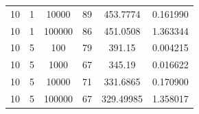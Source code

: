 \documentclass[11pt,a4paper]{report}
\begin{document}
\begin{table}[H]
{\begin{tabular}{c|c|c|c|c|c}
10                                                                                   & 1                                                                                      & 10000                                                                     & 89                                                                                        & 453.7774                                                                  & 0.161990              \\
10                                                                                   & 1                                                                                      & 100000                                                                    & 86                                                                                        & 451.0508                                                                  & 1.363344              \\ \hline
10                                                                                   & 5                                                                                      & 100                                                                       & 79                                                                                        & 391.15                                                                    & 0.004215              \\
10                                                                                   & 5                                                                                      & 1000                                                                      & 67                                                                                        & 345.19                                                                    & 0.016622              \\
10                                                                                   & 5                                                                                      & 10000                                                                     & 71                                                                                        & 331.6865                                                                  & 0.170900              \\
10                                                                                   & 5                                                                                      & 100000                                                                    & 67                                                                                        & 329.49985                                                                 & 1.358017              \\ \hline

\end{tabular}}
\end{table}
\end{document}
